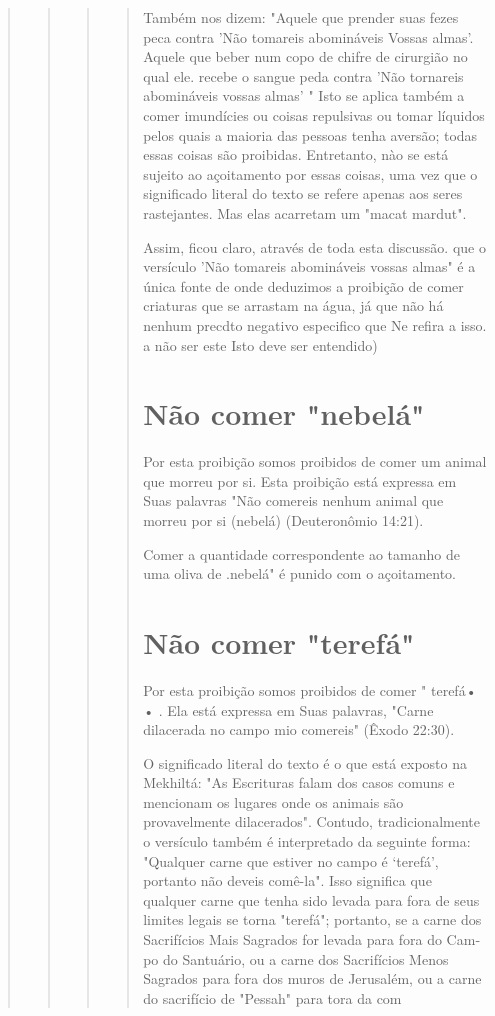 \begin{quote}
\begin{quote}
\begin{quote}
\begin{quote}
Também nos dizem: "Aquele que prender suas fezes peca contra 'Não
tomareis abomináveis Vossas almas'. Aquele que beber num copo de chifre
de cirurgião no qual ele. recebe o sangue peda contra 'Não tornareis
abomináveis vossas almas' " Isto se aplica também a comer imundícies ou
coisas repulsivas ou tomar líquidos pelos quais a maioria das pessoas
tenha aversão; todas essas coisas são proibidas. Entretanto, nào se está
sujeito ao açoitamento por essas coisas, uma vez que o significado
literal do texto se refere apenas aos seres ras­tejantes. Mas elas
acarretam um "macat mardut".

Assim, ficou claro, através de toda esta discussão. que o versículo 'Não
tomareis abomináveis vossas almas" é a única fonte de onde deduzimos a
proibição de comer criaturas que se arrastam na água, já que não há
nenhum precdto negativo especifico que Ne refira a isso. a não ser este
Isto deve ser entendido)

\section{Não comer "nebelá"}

Por esta proibição somos proibidos de comer um animal que mor­reu por
si. Esta proibição está expressa em Suas palavras "Não comereis ne­nhum
animal que morreu por si (nebelá) (Deuteronômio 14:21).

Comer a quantidade correspondente ao tamanho de uma oliva de
.nebelá" é punido com o açoitamento.

\section{Não comer "terefá"}

Por esta proibição somos proibidos de comer " terefá• • . Ela está
ex­pressa em Suas palavras, "Carne dilacerada no campo mio comereis"
(Êxodo 22:30).

O significado literal do texto é o que está exposto na Mekhiltá: "As
Escrituras falam dos casos comuns e mencionam os lugares onde os
ani­mais são provavelmente dilacerados". Contudo, tradicionalmente o
versículo também é interpretado da seguinte forma: "Qualquer carne que
estiver no campo é `terefá', portanto não deveis comê-la". Isso
significa que qualquer carne que tenha sido levada para fora de seus
limites legais se torna "terefá"; portanto, se a carne dos Sacrifícios
Mais Sagrados for levada para fora do Cam­po do Santuário, ou a carne
dos Sacrifícios Menos Sagrados para fora dos mu­ros de Jerusalém, ou a
carne do sacrifício de "Pessah" para tora da com


\end{quote}
\end{quote}
\end{quote}
\end{quote}

